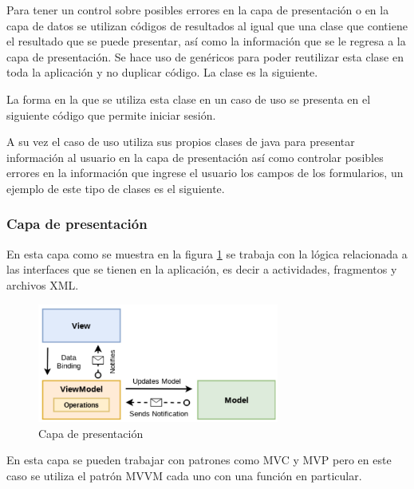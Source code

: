Para tener un control sobre posibles errores en la capa de presentación o en la capa de datos se utilizan códigos de resultados al igual que una clase que contiene el resultado que se puede presentar, así como la información que se le regresa a la capa de presentación. Se hace uso de genéricos para poder reutilizar esta clase en toda la aplicación y no duplicar código. La clase es la siguiente.



La forma en la que se utiliza esta clase en un caso de uso se presenta en el siguiente código que permite iniciar sesión.



A su vez el caso de uso utiliza sus propios clases de java para presentar información al usuario en la capa de presentación así como controlar posibles errores en la información que ingrese el usuario los campos de los formularios, un ejemplo de este tipo de clases es el siguiente.



\subsubsection{Capa de presentación}
En esta capa como se muestra en la figura \ref{fig:capa-presentacion} se trabaja con la lógica relacionada a las interfaces que se tienen en la aplicación, es decir a actividades, fragmentos y archivos XML.

\begin{figure}[h]
    \centering
    \includegraphics[width=300px]{capitulo5/android/img/capa-presentacion.png}
    \caption{Capa de presentación \cite{cleanWayReload}}
    \label{fig:capa-presentacion}
\end{figure}

En esta capa se pueden trabajar con patrones como MVC y MVP pero en este caso se utiliza el patrón MVVM cada uno con una función en particular. \cite{cleanWayReload}

